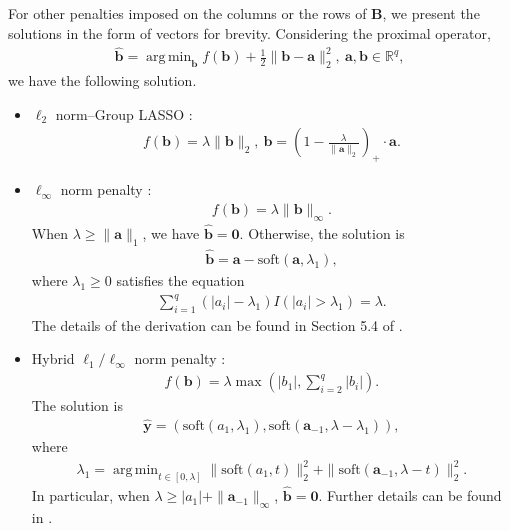\documentclass[preprint,authoryear,11pt]{elsarticle}
\def\mR{\mathbb{R}}
\def\soft{\mbox{soft}}
\newcommand{\bzero}{\mathbf 0}
\newcommand{\B}{\mathbf B}
\newcommand{\y}{\mathbf y}
\newcommand{\ba}{\mathbf a}
\newcommand{\bb}{\mathbf b}
\DeclareMathOperator*{\argmin}{arg\,min} %
\begin{document}
For other penalties imposed on the columns or the rows of $\B$,  we present the solutions in the form of vectors for brevity. Considering the proximal operator, 
\begin{align*}
	\widehat{\bb}=\argmin_{\bb}	f(\bb)+\frac{1}{2} \|\bb-\ba\|_2^2,~\ba,\bb \in \mR^q,
\end{align*}
we have the following solution.
\begin{itemize}
\item $\ell_2$ norm--Group LASSO \citep{yuan2006model}:
\begin{align*}
	f(\bb)=\lambda \|\bb\|_2 ,~\widehat{\bb}=\left(1-\frac{\lambda}{ \|\ba\|_2} \right)_{+} \cdot \ba.
\end{align*}
\item  $\ell_\infty$ norm penalty \citep{duchi2009efficient}:
\begin{align*}
	f(\bb)=\lambda \|\bb\|_\infty.
\end{align*}
When $\lambda \geq \|\ba\|_1$, we have $\hat{\bb}=\bzero$. Otherwise, the solution is 
\begin{align*}
	\widehat{\bb}=\ba-\soft(\ba,\lambda_1),
\end{align*}
where $\lambda_1 \geq 0$ satisfies the equation
\begin{align*}
	\sum_{i=1}^q (|a_i|-\lambda_1) I(|a_i|>\lambda_1)=\lambda.
\end{align*}
The details of the derivation can be found in Section 5.4 of \cite{duchi2009efficient}.
\item Hybrid $\ell_1/\ell_\infty$ norm penalty  \citep{haris2016convex}:
\begin{align*}
f(\bb)=\lambda \max \left(|b_1|, \sum_{i=2}^q |b_i|\right).
\end{align*} 
The solution is 
\begin{align*}
	\widehat{\y}=\left(\soft(a_1,\lambda_1), \soft(\ba_{-1},\lambda-\lambda_1)\right),
\end{align*}
where 
\begin{align*}
	\lambda_1=\argmin_{t \in [0, \lambda]} \|\soft(a_1,t)\|_2^2+\| \soft(\ba_{-1},\lambda-t)\|_2^2.
\end{align*}
In particular, when $\lambda \geq |a_1|+\|\ba_{-1}\|_\infty$, $\widehat{\bb}=\bzero$. Further details can be found in \cite{haris2016convex}.
\end{itemize}
\end{document}
